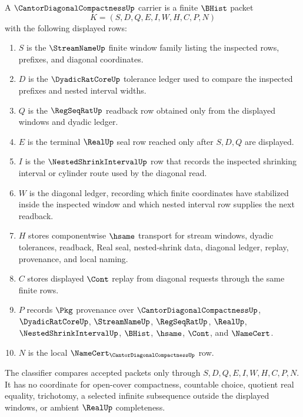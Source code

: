 \begin{definition}
\label{def:cantor-diagonal-compactness-carrier}
A $\CantorDiagonalCompactnessUp$ carrier is a finite $\BHist$ packet
$$
K=(S,D,Q,E,I,W,H,C,P,N)
$$
with the following displayed rows:
\begin{enumerate}
\item $S$ is the $\StreamNameUp$ finite window family listing the inspected rows, prefixes, and diagonal coordinates.
\item $D$ is the $\DyadicRatCoreUp$ tolerance ledger used to compare the inspected prefixes and nested interval widths.
\item $Q$ is the $\RegSeqRatUp$ readback row obtained only from the displayed windows and dyadic ledger.
\item $E$ is the terminal $\RealUp$ seal row reached only after $S,D,Q$ are displayed.
\item $I$ is the $\NestedShrinkIntervalUp$ row that records the inspected shrinking interval or cylinder route used by the diagonal read.
\item $W$ is the diagonal ledger, recording which finite coordinates have stabilized inside the inspected window and which nested interval row supplies the next readback.
\item $H$ stores componentwise $\hsame$ transport for stream windows, dyadic tolerances, readback, Real seal, nested-shrink data, diagonal ledger, replay, provenance, and local naming.
\item $C$ stores displayed $\Cont$ replay from diagonal requests through the same finite rows.
\item $P$ records $\Pkg$ provenance over $\CantorDiagonalCompactnessUp$, $\DyadicRatCoreUp$, $\StreamNameUp$, $\RegSeqRatUp$, $\RealUp$, $\NestedShrinkIntervalUp$, $\BHist$, $\hsame$, $\Cont$, and $\NameCert$.
\item $N$ is the local $\NameCert_{\CantorDiagonalCompactnessUp}$ row.
\end{enumerate}
The classifier compares accepted packets only through $S,D,Q,E,I,W,H,C,P,N$. It has no coordinate for open-cover compactness, countable choice, quotient real equality, trichotomy, a selected infinite subsequence outside the displayed windows, or ambient $\RealUp$ completeness.
\end{definition}

